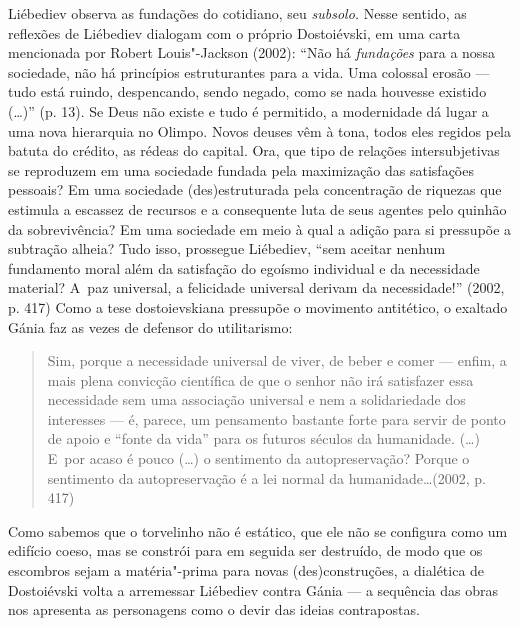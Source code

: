 Liébediev observa as fundações do cotidiano, seu \emph{subsolo.} Nesse
sentido, as reflexões de Liébediev dialogam com o próprio Dostoiévski,
em uma carta mencionada por Robert Louis"-Jackson (2002): ``Não há
\emph{fundações} para a nossa sociedade, não há princípios estruturantes
para a vida. Uma colossal erosão --- tudo está ruindo, despencando, sendo
negado, como se nada houvesse existido (\ldots)'' (p. 13). Se Deus não
existe e tudo é permitido, a modernidade dá lugar a uma nova hierarquia
no Olimpo. Novos deuses vêm à tona, todos eles regidos pela batuta do
crédito, as rédeas do capital. Ora, que tipo de relações intersubjetivas
se reproduzem em uma sociedade fundada pela maximização das satisfações
pessoais? Em uma sociedade (des)estruturada pela concentração de
riquezas que estimula a escassez de recursos e a consequente luta de
seus agentes pelo quinhão da sobrevivência? Em uma sociedade em meio à
qual a adição para si pressupõe a subtração alheia? Tudo isso, prossegue
Liébediev, ``sem aceitar nenhum fundamento moral além da satisfação do
egoísmo individual e da necessidade material? A~paz universal, a
felicidade universal derivam da necessidade!'' (2002, p. 417) Como a
tese dostoievskiana pressupõe o movimento antitético, o exaltado Gánia
faz as vezes de defensor do utilitarismo:

\begin{quote}
Sim, porque a necessidade universal de viver, de beber e comer --- enfim,
a mais plena convicção científica de que o senhor não irá satisfazer
essa necessidade sem uma associação universal e nem a solidariedade dos
interesses --- é, parece, um pensamento bastante forte para servir de
ponto de apoio e ``fonte da vida'' para os futuros séculos da
humanidade. (\ldots) E~por acaso é pouco (\ldots) o sentimento da
autopreservação? Porque o sentimento da autopreservação é a lei normal
da humanidade\ldots (2002, p. 417)
\end{quote}

Como sabemos que o torvelinho não é estático, que ele não se configura
como um edifício coeso, mas se constrói para em seguida ser destruído,
de modo que os escombros sejam a matéria"-prima para novas
(des)construções, a dialética de Dostoiévski volta a arremessar
Liébediev contra Gánia --- a sequência das obras nos apresenta as
personagens como o devir das ideias contrapostas.

